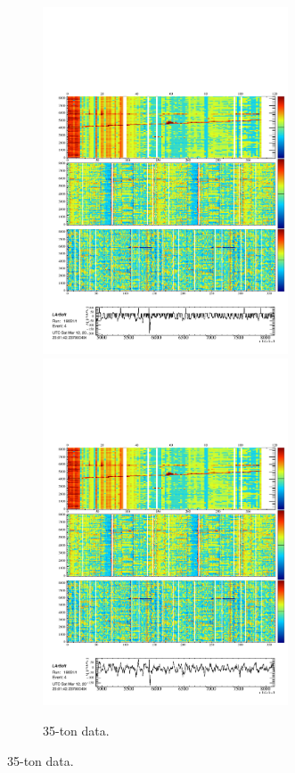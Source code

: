 \begin{figure}
\begin{subfigure}[t]{\linewidth}
\begin{minipage}{0.48\textwidth}
      \includegraphics[width=0.8\textwidth]{DataMuonU1.pdf}
      \includegraphics[width=0.8\textwidth]{DataMuonU2.pdf}
    \end{minipage}
    \caption{35-ton data.}
    \label{fig:DataMuon}
  \end{subfigure}


\end{figure}
